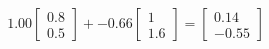 \documentclass[preview]{standalone}
\begin{document}
\begin{align*}
1.00 \begin{bmatrix} 0.8 \\ 0.5 \end{bmatrix} + -0.66 \begin{bmatrix} 1 \\ 1.6 \end{bmatrix} = \begin{bmatrix} 0.14 \\ -0.55 \end{bmatrix}
\end{align*}
\end{document}
